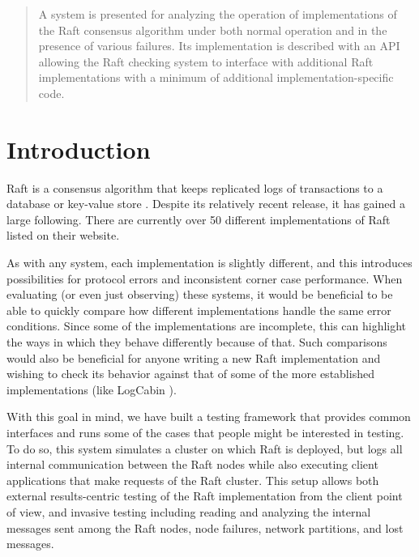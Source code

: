 \documentclass[UTF8]{article}
\begin{document}
 

\setlength\parindent{24pt}

\begin{abstract}
	
A system is presented for analyzing the operation of implementations of the Raft consensus algorithm under both normal operation and in the presence of various failures. Its implementation is described with an API allowing the Raft checking system to interface with additional Raft implementations with a minimum of additional implementation-specific code.

\end{abstract} 

\section{Introduction}

Raft is a consensus algorithm that keeps replicated logs of transactions to a database or key-value store \cite{raftPaper}. Despite its relatively recent release, it has gained a large following. There are currently over 50 different implementations of Raft listed on their website.
 
As with any system, each implementation is slightly different, and this introduces possibilities for protocol errors and inconsistent corner case performance. When evaluating (or even just observing) these systems, it would be beneficial to be able to quickly compare how different implementations handle the same error conditions. Since some of the implementations are incomplete, this can highlight the ways in which they behave differently because of that. Such comparisons would also be beneficial for anyone writing a new Raft implementation and wishing to check its behavior against that of some of the more established implementations (like LogCabin \cite{logCabin}). 

With this goal in mind, we have built a testing framework that provides common interfaces and runs some of the cases that people might be interested in testing. To do so, this system simulates a cluster on which Raft is deployed, but logs all internal communication between the Raft nodes while also executing client applications that make requests of the Raft cluster. This setup allows both external results-centric testing of the Raft implementation from the client point of view, and invasive testing including reading and analyzing the internal messages sent among the Raft nodes, node failures, network partitions, and lost messages.
\end{document}
